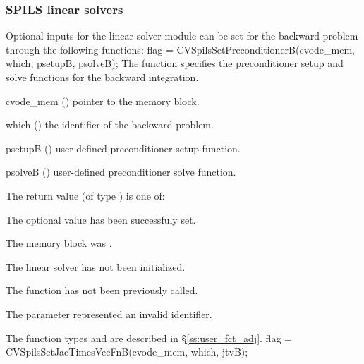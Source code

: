\subsubsection{SPILS linear solvers}
Optional inputs for the {\cvspils} linear solver module can be set for the backward
problem through the following functions:
{
  flag = CVSpilsSetPreconditionerB(cvode\_mem, which, psetupB, psolveB);
}
{
  The function  specifies the preconditioner
  setup and solve functions for the backward integration.
}
{
  \begin{args}[psetupB]
  \item[cvode\_mem] ()
    pointer to the {\cvodes} memory block.
  \item[which] ()
    the identifier of the backward problem.
  \item[psetupB] ()
    user-defined preconditioner setup function.
  \item[psolveB] ()
    user-defined preconditioner solve function.
  \end{args}
}
{
  The return value  (of type ) is one of:
  \begin{args}
  \item[\Id{CVSPILS\_SUCCESS}] 
    The optional value has been successfuly set.
  \item[\Id{CVSPILS\_MEM\_NULL}]
    The  memory block was .
  \item[\Id{CVSPILS\_LMEM\_NULL}]
    The {\cvspils} linear solver has not been initialized.
  \item[\Id{CVSPILS\_NO\_ADJ}]
    The function  has not been previously called.
  \item[\Id{CVSPILS\_ILL\_INPUT}]
    The parameter  represented an invalid identifier.
  \end{args}
}
{
   The function types  and  are
   described in \S\ref{ss:user_fct_adj}.
}
{
  flag = CVSpilsSetJacTimesVecFnB(cvode\_mem, which, jtvB);
}
